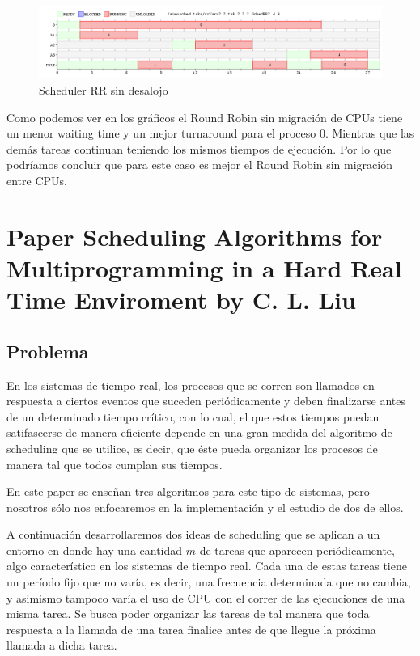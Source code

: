 \begin{figure}[H]
  \centering
\includegraphics[scale=0.45]{graficos/rrVsrr2/4.png}
  \caption[Caption for LOF]{Scheduler RR sin desalojo}
\end{figure}
Como podemos ver en los gráficos el Round Robin sin migración de CPUs tiene un menor waiting time y un mejor turnaround para el proceso 0. Mientras que las demás tareas continuan teniendo los mismos tiempos de ejecución. Por lo que podríamos concluir que para este caso es mejor el Round Robin sin migración entre CPUs.
\\
\section{Paper Scheduling Algorithms for Multiprogramming in a Hard Real Time Enviroment by C. L. Liu}
\subsection{Problema}

En los sistemas de tiempo real, los procesos que se corren son llamados en respuesta a ciertos eventos que suceden periódicamente y deben finalizarse antes de un determinado tiempo crítico, con lo cual, el que estos tiempos puedan satifascerse de manera eficiente depende en una gran medida del algoritmo de scheduling que se utilice, es decir, que éste pueda organizar los procesos de manera tal que todos cumplan sus tiempos.

En este paper se enseñan tres algoritmos para este tipo de sistemas, pero nosotros sólo nos enfocaremos en la implementación y el estudio de dos de ellos.

A continuación desarrollaremos dos ideas de scheduling que se aplican a un entorno en donde hay una cantidad $m$ de tareas que aparecen periódicamente, algo característico en los sistemas de tiempo real. Cada una de estas tareas tiene un período fijo que no varía, es decir, una frecuencia determinada que no cambia, y asimismo tampoco varía el uso de CPU con el correr de las ejecuciones de una misma tarea. Se busca poder organizar las tareas de tal manera que toda respuesta a la llamada de una tarea finalice antes de que llegue la próxima llamada a dicha tarea.

